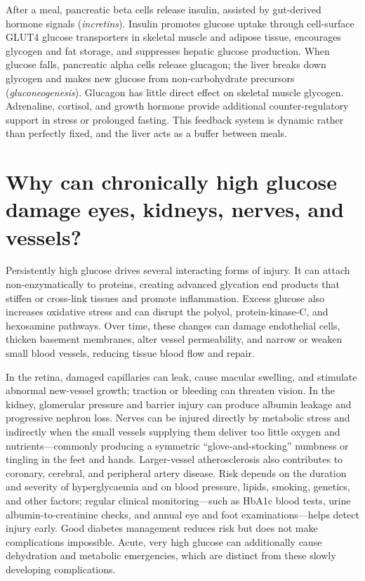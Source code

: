 \documentclass[11pt,oneside]{report}
\begin{document}
After a meal, pancreatic beta cells release insulin, assisted by gut-derived
hormone signals (\emph{incretins}). Insulin promotes glucose uptake through
cell-surface GLUT4 glucose transporters in skeletal muscle and adipose tissue,
encourages glycogen and fat storage, and suppresses hepatic glucose production.
When glucose falls, pancreatic alpha cells release glucagon; the liver breaks
down glycogen and makes new glucose from non-carbohydrate precursors
(\emph{gluconeogenesis}). Glucagon has little direct effect on skeletal muscle glycogen.
Adrenaline, cortisol, and growth hormone provide additional
counter-regulatory support in stress or prolonged fasting. This feedback
system is dynamic rather than perfectly fixed, and the liver acts as a buffer
between meals.

\section{Why can chronically high glucose damage eyes, kidneys, nerves, and vessels?}

Persistently high glucose drives several interacting forms of injury. It can
attach non-enzymatically to proteins, creating advanced glycation end products
that stiffen or cross-link tissues and promote inflammation. Excess glucose
also increases oxidative stress and can disrupt the polyol, protein-kinase-C,
and hexosamine pathways. Over time, these changes can damage endothelial
cells, thicken basement membranes, alter vessel permeability, and narrow or
weaken small blood vessels, reducing tissue blood flow and repair.

In the retina, damaged capillaries can leak, cause macular swelling, and
stimulate abnormal new-vessel growth; traction or bleeding can threaten
vision. In the kidney, glomerular pressure and barrier injury can produce
albumin leakage and progressive nephron loss. Nerves can be injured directly
by metabolic stress and indirectly when the small vessels supplying them
deliver too little oxygen and nutrients—commonly producing a symmetric
``glove-and-stocking'' numbness or tingling in the feet and hands. Larger-vessel
atherosclerosis also contributes to coronary, cerebral, and peripheral artery
disease. Risk depends on the duration and severity of hyperglycaemia and on
blood pressure, lipids, smoking, genetics, and other factors; regular clinical
monitoring—such as HbA1c blood tests, urine albumin-to-creatinine checks, and
annual eye and foot examinations—helps detect injury early. Good diabetes
management reduces risk but does not make complications impossible. Acute, very high glucose can
additionally cause dehydration and metabolic emergencies, which are distinct
from these slowly developing complications.
\end{document}
